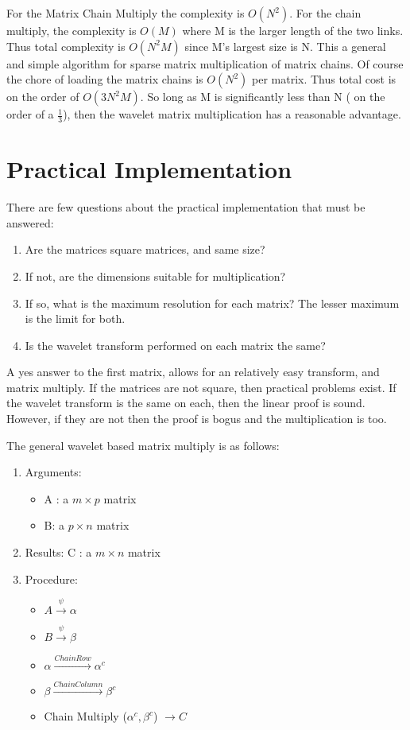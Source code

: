 For the Matrix Chain Multiply the complexity is $O(N^2)$.  For the chain multiply, the complexity is $O(M)$ where M is the larger length of the two links.  Thus total complexity is $O(N^2 M)$ since M's largest size is N.  This a general and simple algorithm for sparse matrix multiplication of matrix chains.  Of course the chore of loading the matrix chains is $O(N^2)$ per matrix.  Thus total cost is on the order of $O(3N^2 M)$.  So long as M is significantly less than N ( on the order of a $\frac{1}{3}$), then the wavelet matrix multiplication has a reasonable advantage.  

\section{Practical Implementation}

There are few questions about the practical implementation that must be answered:
\begin{enumerate}
\item Are the matrices square matrices, and same size?
\item If not, are the dimensions suitable for multiplication?
\item If so, what is the maximum resolution for each matrix?  The lesser maximum is the limit for both.
\item Is the wavelet transform performed on each matrix the same?
\end{enumerate}

A yes answer to the first matrix, allows for an relatively easy transform, and matrix multiply.  If the matrices are not square, then practical problems exist.  If the wavelet transform is the same on each, then the linear proof is sound.  However, if they are not then the proof is bogus and the multiplication is too.  

The general wavelet based matrix multiply is as follows:
\begin{enumerate}
\item Arguments:  
\begin{itemize}
\item A :  a $m \times p$ matrix
\item B: a $p \times n$ matrix
\end{itemize}
\item Results:  C : a $m \times n$ matrix
\item Procedure:
\begin{itemize}
\item $ A \stackrel{\psi}{\to} \alpha$
\item $ B \stackrel{\psi}{\to} \beta$
\item $ \alpha \stackrel {Chain Row}{\to} \alpha ^c$
\item $ \beta \stackrel {Chain Column}{\to} \beta ^c$
\item Chain Multiply ($\alpha ^c , \beta ^c$) $\to C$ 
\end{itemize}
\end{enumerate}


